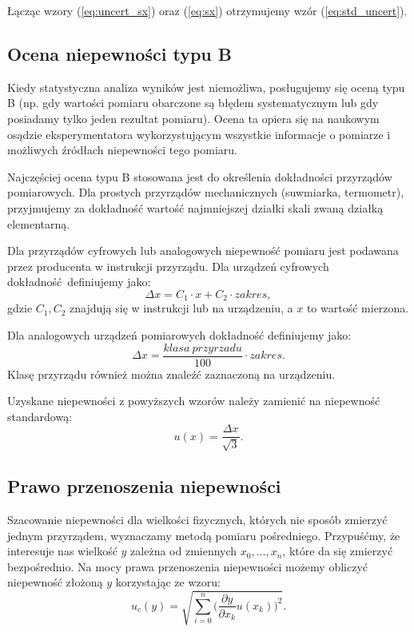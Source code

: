 \documentclass[12pt,a4paper]{article}
\numberwithin{equation}{section}
\begin{document}
Łącząc wzory (\ref{eq:uncert_sx}) oraz (\ref{eq:sx}) otrzymujemy wzór (\ref{eq:std_uncert}).

\subsection{Ocena niepewności typu B}

Kiedy statystyczna analiza wyników jest niemożliwa, posługujemy się oceną typu B (np. gdy wartości pomiaru obarczone są błędem systematycznym lub gdy posiadamy tylko jeden rezultat pomiaru). Ocena ta opiera się na naukowym osądzie eksperymentatora wykorzystującym wszystkie informacje o pomiarze i możliwych źródłach niepewności tego pomiaru.

Najczęściej ocena typu B stosowana jest do określenia dokładności przyrządów pomiarowych. Dla prostych przyrządów mechanicznych (suwmiarka, termometr), przyjmujemy za dokładność wartość najmniejszej działki skali zwaną działką elementarną.

Dla przyrządów cyfrowych lub analogowych niepewność pomiaru jest podawana przez producenta w instrukcji przyrządu. Dla urządzeń cyfrowych dokładność definiujemy jako:
\begin{equation}
	\Delta x = C_1 \cdot x + C_2 \cdot zakres,
\end{equation}
gdzie $C_1, C_2$ znajdują się w instrukcji lub na urządzeniu, a $x$ to wartość mierzona.

Dla analogowych urządzeń pomiarowych dokładność definiujemy jako:
\begin{equation}
	\Delta x = \frac{klasa~przyrzadu}{100} \cdot zakres.
\end{equation}
Klasę przyrządu również można znaleźć zaznaczoną na urządzeniu.

Uzyskane niepewności z powyższych wzorów należy zamienić na niepewność standardową:
\begin{equation}
	u(x) = \frac{\Delta x}{\sqrt{3}}.
\end{equation}

\pagebreak
\subsection{Prawo przenoszenia niepewności}
Szacowanie niepewności dla wielkości fizycznych, których nie sposób zmierzyć jednym przyrządem, wyznaczamy metodą pomiaru pośredniego. Przypuśćmy, że interesuje nas wielkość $y$ zależna od zmiennych $x_0, \ldots, x_n$, które da się zmierzyć bezpośrednio. Na mocy prawa przenoszenia niepewności możemy obliczyć niepewność złożoną $y$ korzystając ze wzoru:
\begin{equation}
	u_c(y) = \sqrt{\sum_{i=0}^{n}\Bigg(\frac{\partial y}{\partial x_k}u(x_k)\Bigg)^2}.
	\label{eq:uc}
\end{equation}
\end{document}
